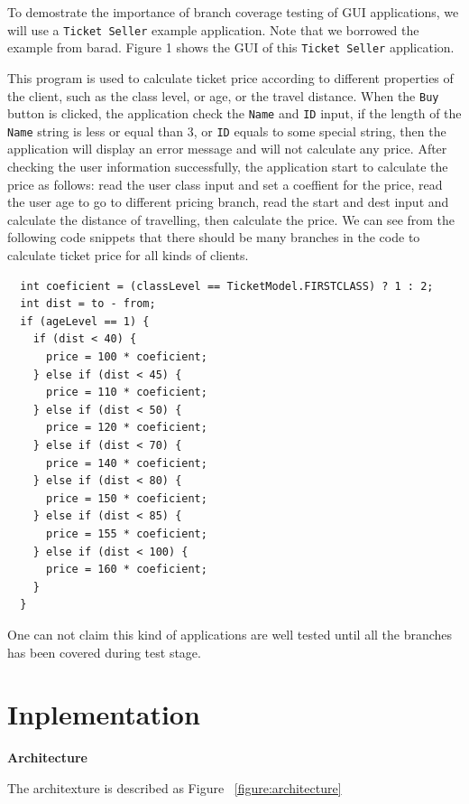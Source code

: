 \documentclass{article}
\begin{document}
To demostrate  the importance of branch coverage testing of GUI applications, we will use a  \texttt{Ticket Seller} example application. Note that we borrowed the example from barad. Figure 1 shows the GUI of this \texttt{Ticket Seller} application.

This program is used to calculate ticket price according to different properties of the client, such as the class level, or age, or the travel distance. When the \texttt{Buy} button is clicked, the application check the \texttt{Name} and \texttt{ID} input, if the length of the \texttt{Name} string is less or equal than 3, or \texttt{ID} equals to some special string, then the application will display an error message and will not calculate any price. After checking the user information successfully, the application start to calculate the price as follows: read the user class input and set a coeffient for the price, read the user age to go to different pricing branch, read the start and dest input and calculate the distance of travelling, then calculate the price. We can see from the following code snippets that there should be many branches in the code to calculate ticket price for all kinds of clients.

\begin{lstlisting}
  int coeficient = (classLevel == TicketModel.FIRSTCLASS) ? 1 : 2;
  int dist = to - from;
  if (ageLevel == 1) {
    if (dist < 40) {
      price = 100 * coeficient;
    } else if (dist < 45) {
      price = 110 * coeficient;
    } else if (dist < 50) {
      price = 120 * coeficient;
    } else if (dist < 70) {
      price = 140 * coeficient;
    } else if (dist < 80) {
      price = 150 * coeficient;
    } else if (dist < 85) {
      price = 155 * coeficient;
    } else if (dist < 100) {
      price = 160 * coeficient;
    }
  }
\end{lstlisting}

One can not claim this kind of applications are well tested until all the branches has been covered during test stage.


\section{Inplementation}

\textbf{Architecture}

The architexture is described as Figure ~\ref{figure:architecture}
\end{document}
